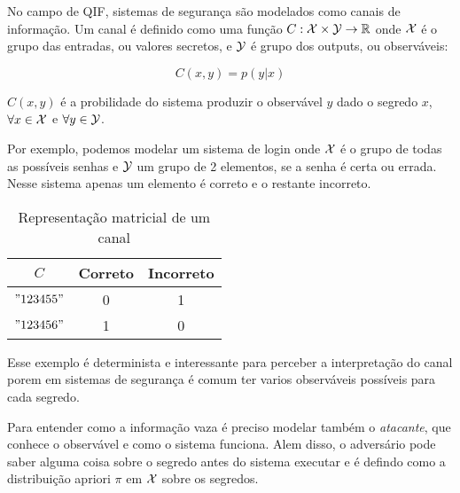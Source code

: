 
% 

No campo de QIF, sistemas de segurança são modelados como canais de informação. Um canal é definido como uma função $C: \mathcal{X} \times \mathcal{Y} \rightarrow \mathbb{R}$ onde $\mathcal{X}$ é o grupo das entradas, ou valores secretos, e $\mathcal{Y}$ é grupo dos outputs, ou observáveis:

$$ C(x,y) = p(y|x) $$

$C(x,y)$ é a probilidade do sistema produzir o observável $y$ dado o segredo $x$, $\forall x \in \mathcal{X}$ e $\forall y \in \mathcal{Y}$.

Por exemplo, podemos modelar um sistema de login onde $\mathcal{X}$ é o grupo de todas as possíveis senhas e $\mathcal{Y}$ um grupo de 2 elementos, se a senha é certa ou errada. Nesse sistema apenas um elemento é correto e o restante incorreto.
\begin{table}[h!]
\centering
\begin{tabular}{|c|c c|}
    \hline
    $C$   & Correto & Incorreto  \\
    \hline 
    $"123455"$&0&1\\
    $"123456"$&1&0\\
    \hline
\end{tabular}
\caption{Representação matricial de um canal}
\label{Tabela:1}
\end{table}
Esse exemplo é determinista e interessante para perceber a interpretação do canal porem em sistemas de segurança é comum ter varios observáveis possíveis para cada segredo.

Para entender como a informação vaza é preciso modelar também o \emph{atacante}, que conhece o observável e como o sistema funciona. Alem disso, o adversário pode saber alguma coisa sobre o segredo antes do sistema executar e é defindo como a distribuição apriori $\pi$ em $\mathcal{X}$ sobre os segredos.



